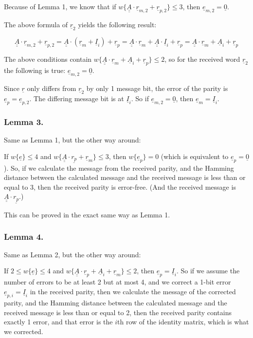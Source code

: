 \documentclass[11pt,a4paper,oneside]{report}             %
\def\doubleunderline#1{\underline{\underline{#1}}}
\def\dul#1{\doubleunderline{#1}}
\def\ul#1{\underline{#1}}
\begin{document}
Because of Lemma 1, we know that
if $w\{ \dul{A} \cdot \ul{r}_{m,2} + \ul{r}_{p,2} \} \leq 3$, then $\ul{e}_{m,2} = \ul{0}$.

The above formula of $\ul{r}_2$ yields the following result:

\[
    \dul{A} \cdot \ul{r}_{m,2} + \ul{r}_{p,2} =
    \dul{A} \cdot ( \ul{r}_m + \ul{I}_i ) + \ul{r}_p =
    \dul{A} \cdot \ul{r}_m + \dul{A} \cdot \ul{I}_i + \ul{r}_p =
    \dul{A} \cdot \ul{r}_m + \ul{A}_i + \ul{r}_p
\]

The above conditions contain $w \{ \dul{A} \cdot \ul{r}_m + \ul{A}_i + \ul{r}_p \} \leq 2$,
so for the received word $\ul{r}_2$ the following is true: $\ul{e}_{m,2} = \ul{0}$.

Since $\ul{r}$ only differs from $\ul{r}_2$ by only 1 message bit, the error of the parity is
$\ul{e}_p = \ul{e}_{p,2}$. The differing message bit is at $\ul{I}_i$.
So if $\ul{e}_{m,2} = \ul{0}$, then $\ul{e}_m = \ul{I}_i$.

\subsubsection{Lemma 3.}

Same as Lemma 1, but the other way around:

If $w\{\ul{e}\} \leq 4$ and $w\{\dul{A} \cdot \ul {r_p} + \ul{r}_m\} \leq 3$,
then $w\{\ul{e}_p\} = 0$  (which is equivalent to $\ul{e}_p = \ul{0}$).
So, if we calculate the message from the received parity, and
the Hamming distance between the calculated message and the received message is less than
or equal to 3, then the received parity is error-free. (And the received message is
$\dul{A} \cdot \ul {r_p}$.)

This can be proved in the exact same way as Lemma 1.

\subsubsection{Lemma 4.}

Same as Lemma 2, but the other way around:

If $2 \leq w\{\ul{e}\} \leq 4$ and $w\{\dul{A} \cdot \ul{r}_p + \ul{A}_i + \ul{r}_m\} \leq 2$,
then $\ul{e}_p = \ul{I}_i$. So if we assume the number of errors to be at least 2 but at most 4,
and we correct a 1-bit error $\ul{e}_{p, i} = \ul{I}_i$ in the received parity, then we calculate
the message of the corrected parity, and the Hamming distance between the calculated message and
the received message is less than or equal to 2, then the received parity contains exactly 1 error,
and that error is the $i$th row of the identity matrix, which is what we corrected.
\end{document}
